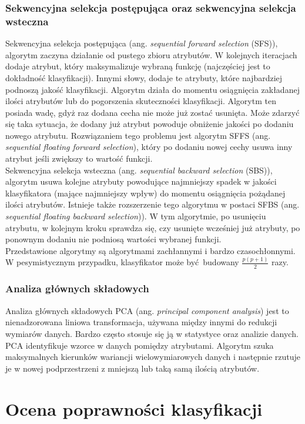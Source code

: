 \subsubsection{Sekwencyjna selekcja postępująca oraz sekwencyjna selekcja wsteczna}
Sekwencyjna selekcja postępująca (ang. \textit{sequential forward selection} (SFS)), algorytm zaczyna działanie od pustego zbioru atrybutów. W kolejnych iteracjach dodaje atrybut, który maksymalizuje wybraną funkcję (najczęściej jest to dokładność klasyfikacji). Innymi słowy, dodaje te atrybuty, które najbardziej podnoszą jakość klasyfikacji. Algorytm działa do momentu osiągnięcia zakładanej ilości atrybutów lub do pogorszenia skuteczności klasyfikacji. Algorytm ten posiada wadę, gdyż raz dodana cecha nie może już zostać usunięta. Może zdarzyć się taka sytuacja, że dodany już atrybut powoduje obniżenie jakości po dodaniu nowego atrybutu. Rozwiązaniem tego problemu jest algorytm SFFS (ang. \textit{sequential floating forward selection}), który po dodaniu nowej cechy usuwa inny atrybut jeśli zwiększy to wartość funkcji. \\
Sekwencyjna selekcja wsteczna (ang. \textit{sequential backward selection} (SBS)), algorytm usuwa kolejne atrybuty powodujące najmniejszy spadek w jakości klasyfikatora (mające najmniejszy wpływ) do momentu osiągnięcia pożądanej ilości atrybutów. Istnieje także rozszerzenie tego algorytmu w postaci SFBS (ang. \textit{sequential floating backward selection})). W tym algorytmie, po usunięciu atrybutu, w kolejnym kroku sprawdza się, czy usunięte wcześniej już atrybuty, po ponownym dodaniu nie podniosą wartości wybranej funkcji. \\
Przedstawione algorytmy są algorytmami zachłannymi i bardzo czasochłonnymi. W pesymistycznym przypadku, klasyfikator może być budowany $\frac{p(p+1)}{2}$ razy.
\subsubsection{Analiza głównych składowych}
Analiza głównych składowych PCA (ang. \textit{principal component analysis}) jest to nienadzorowana liniowa transformacja, używana między innymi do redukcji wymiarów danych. Bardzo często stosuje się ją w statystyce oraz analizie danych. PCA identyfikuje wzorce w danych pomiędzy atrybutami. Algorytm szuka maksymalnych kierunków wariancji wielowymiarowych danych i następnie rzutuje je w nowej podprzestrzeni z mniejszą lub taką samą ilością atrybutów. 

\section{Ocena poprawności klasyfikacji}
